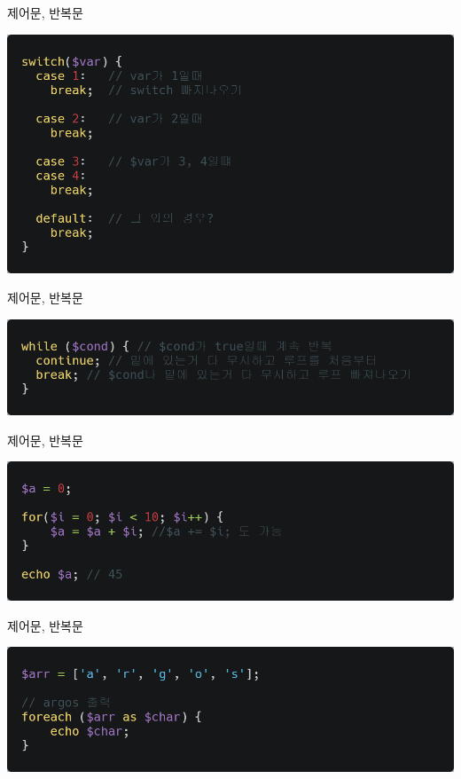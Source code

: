 \documentclass{beamer}
\begin{document}
    \begin{frame}{제어문, 반복문}
        \begin{center}
            \includegraphics[width=\textwidth]{Images/php12.png}
        \end{center}
    \end{frame}

    \begin{frame}{제어문, 반복문}
        \begin{center}
            \includegraphics[width=\textwidth]{Images/php13.png}
        \end{center}
    \end{frame}

    \begin{frame}{제어문, 반복문}
        \begin{center}
            \includegraphics[width=\textwidth]{Images/php14.png}
        \end{center}
    \end{frame}

    \begin{frame}{제어문, 반복문}
        \begin{center}
            \includegraphics[width=\textwidth]{Images/php15.png}
        \end{center}
    \end{frame}
\end{document}
